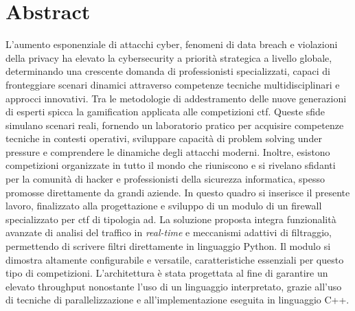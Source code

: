 \chapter*{Abstract}

L'aumento esponenziale di attacchi cyber, fenomeni di data breach e violazioni della privacy ha elevato la cybersecurity a priorità strategica a livello globale, determinando una crescente domanda di professionisti specializzati, capaci di fronteggiare scenari dinamici attraverso competenze tecniche multidisciplinari e approcci innovativi.
Tra le metodologie di addestramento delle nuove generazioni di esperti spicca la gamification applicata alle competizioni \gls{ctf}. Queste sfide simulano scenari reali, fornendo un laboratorio pratico per acquisire competenze tecniche in contesti operativi, sviluppare capacità di problem solving under pressure e comprendere le dinamiche degli attacchi moderni.
Inoltre, esistono competizioni organizzate in tutto il mondo che riuniscono e si rivelano sfidanti per la comunità di hacker e professionisti della sicurezza informatica, spesso promosse direttamente da grandi aziende.
In questo quadro si inserisce il presente lavoro, finalizzato alla progettazione e sviluppo di un modulo di un firewall specializzato per \gls{ctf} di tipologia \gls{ad}. La soluzione proposta integra funzionalità avanzate di analisi del traffico in \textit{real-time} e meccanismi adattivi di filtraggio, permettendo di scrivere filtri direttamente in linguaggio Python.
Il modulo si dimostra altamente configurabile e versatile, caratteristiche essenziali per questo tipo di competizioni. L'architettura è stata progettata al fine di garantire un elevato throughput nonostante l’uso di un linguaggio interpretato, grazie all'uso di tecniche di parallelizzazione e all'implementazione eseguita in linguaggio C++.
